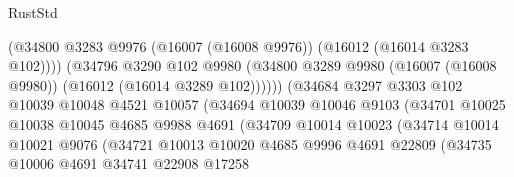 \begin{lexlean}{RustStd}
\begin{coremodule}
                                        (@34800
                                          @3283
                                          @9976
                                          (@16007 (@16008 @9976))
                                          (@16012 (@16014 @3283 @102))))
                                      (@34796
                                        @3290
                                        @102
                                        @9980
                                        (@34800
                                          @3289
                                          @9980
                                          (@16007 (@16008 @9980))
                                          (@16012 (@16014 @3289 @102))))))
                                  (@34684
                                    @3297
                                    @3303
                                    @102
                                    @10039
                                    @10048
                                    @4521
                                    @10057
                                    (@34694
                                      @10039
                                      @10046
                                      @9103
                                      (@34701
                                        @10025
                                        @10038
                                        @10045
                                        @4685
                                        @9988
                                        @4691
                                        (@34709
                                          @10014
                                          @10023
                                          (@34714
                                            @10014
                                            @10021
                                            @9076
                                            (@34721
                                              @10013
                                              @10020
                                              @4685
                                              @9996
                                              @4691
                                              @22809
                                              (@34735
                                                @10006
                                                @4691
                                                @34741
                                                @22908
                                                @17258

\end{coremodule}
\end{lexlean}
